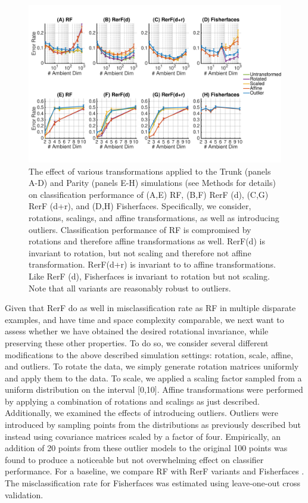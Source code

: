 \documentclass{article} %
\begin{document}
\begin{figure}[h]
\begin{center}
\includegraphics[trim=0in 0.9in 0in .09in, clip=true, width=\linewidth]{../Figures/pdf/Fig3_Invariance_v2}
\end{center}
\caption{The effect of various transformations applied to the Trunk (panels A-D) and Parity (panels E-H) simulations (see Methods for details) on classification performance of (A,E) RF, (B,F) RerF (d), (C,G) RerF (d+r), and (D,H) Fisherfaces. Specifically, we consider, rotations, scalings, and affine transformations, as well as introducing outliers. Classification performance of RF is compromised by rotations and therefore affine transformations as well. RerF(d) is invariant to rotation, but not scaling and therefore not affine transformation. RerF(d+r) is invariant to to affine transformations. Like RerF (d), Fisherfaces is invariant to rotation but not scaling. Note that all variants are reasonably robust to outliers.}
\label{fig:invar}
\end{figure}


Given that RerF do as well in misclassification rate as RF in multiple disparate examples, and have time and space complexity comparable, we next want to assess whether we have obtained the desired rotational invariance, while preserving these other properties.  To do so, we consider several different modifications to the above described simulation settings: rotation, scale, affine, and outliers.  To rotate the data, we simply generate rotation matrices uniformly and apply them to the data.  To scale, we applied a scaling factor sampled from a uniform distribution on the interval [0,10]. 
Affine transformations were performed by applying a combination of rotations and scalings as just described. Additionally, we examined the effects of introducing outliers. Outliers were introduced by sampling points from the distributions as previously described but instead using covariance matrices scaled by a factor of four. Empirically, an addition of 20 points from these outlier models to the original 100 points was found to produce a noticeable but not overwhelming effect on classifier performance. For a baseline, we compare RF with RerF variants and Fisherfaces \cite{Fisherfaces}. The misclassification rate for Fisherfaces was estimated using leave-one-out cross validation.
\end{document}
